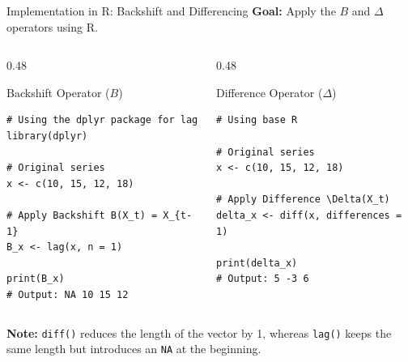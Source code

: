 \documentclass[aspectratio=169]{beamer}
\begin{document}
\begin{frame}[fragile]{Implementation in R: Backshift and Differencing}
\small
\textbf{Goal:} Apply the $B$ and $\Delta$ operators using R.

\vspace{0.2cm}

\begin{columns}[T]
\begin{column}{0.48\textwidth}
\begin{block}{Backshift Operator ($B$)}
\begin{verbatim}
# Using the dplyr package for lag
library(dplyr)

# Original series
x <- c(10, 15, 12, 18)

# Apply Backshift B(X_t) = X_{t-1}
B_x <- lag(x, n = 1)

print(B_x)
# Output: NA 10 15 12
\end{verbatim}
\end{block}
\end{column}

\begin{column}{0.48\textwidth}
\begin{block}{Difference Operator ($\Delta$)}
\begin{verbatim}
# Using base R

# Original series
x <- c(10, 15, 12, 18)

# Apply Difference \Delta(X_t)
delta_x <- diff(x, differences = 1)

print(delta_x)
# Output: 5 -3 6
\end{verbatim}
\end{block}
\end{column}
\end{columns}

\vspace{0.3cm}
\textbf{Note:} \texttt{diff()} reduces the length of the vector by 1, whereas \texttt{lag()} keeps the same length but introduces an \texttt{NA} at the beginning.
\end{frame}
\end{document}
